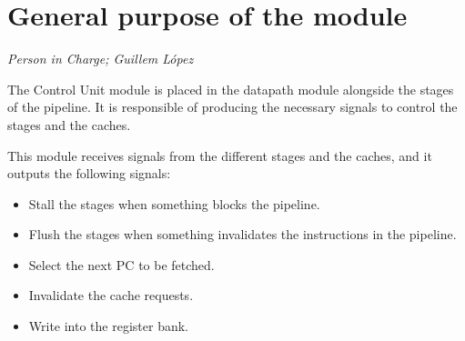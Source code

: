 \newpage
\section{General purpose of the module}
\textit{Person in Charge; Guillem López}

The Control Unit module is placed in the datapath module alongside the stages of the pipeline.
It is responsible of producing the necessary signals to control the stages and the caches.

This module receives signals from the different stages and the caches, and it outputs the following signals:

\begin{itemize}
    \item Stall the stages when something blocks the pipeline.
    \item Flush the stages when something invalidates the instructions in the pipeline.
    \item Select the next PC to be fetched.
    \item Invalidate the cache requests.
    \item Write into the register bank.
\end{itemize}
